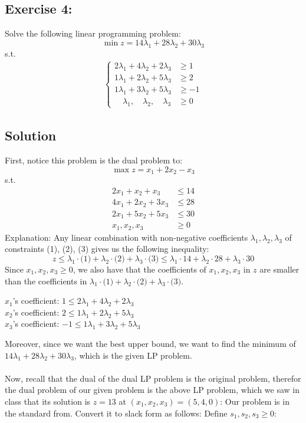 \documentclass{article}
\begin{document}
\subsection{Exercise 4:} Solve the following linear programming problem:
\[\min z = 14\lambda_1 + 28\lambda_2 +30\lambda_3\]
s.t.
\begin{align*}
    \begin{cases}
    2\lambda_1 + 4\lambda_2 +2\lambda_3&\geq 1 \\ 1\lambda_1 + 2\lambda_2 +5\lambda_3&\geq 2 \\
    1\lambda_1 + 3\lambda_2 +5\lambda_3&\geq -1 \\ \quad \lambda_1, \quad \lambda_2,\quad \lambda_3&\geq 0
    \end{cases}
\end{align*}
\subsection*{Solution}
First, notice this problem is the dual problem to: 
\[\max z =x_1 + 2x_2 -x_3\]
s.t.
\begin{align*}
    2x_1 +x_2 + x_3 &\le 14 \\ 4x_1 +2x_2 +3x_3 &\le 28 \\ 2x_1 +5x_2 +5x_3 &\le 30 \\ x_1, x_2, x_3 &\ge 0
\end{align*}
Explanation: Any linear combination with non-negative coefficients $\lambda_1, \lambda_2, \lambda_3$ of constraints (1), (2), (3) gives us the following inequality: 
\[z\le \lambda_1\cdot\text{(1)}+\lambda_2\cdot\text{(2)}+\lambda_3\cdot\text{(3)}\le \lambda_1\cdot 14 +\lambda_2\cdot 28 +\lambda_3\cdot 30\]
Since $x_1, x_2, x_3 \ge 0$, we also have that the coefficients of $x_1, x_2, x_3$ in $z$ are smaller than the coefficients in $\lambda_1\cdot\text{(1)}+\lambda_2\cdot\text{(2)}+\lambda_3\cdot\text{(3)}$.
\begin{center}
$x_1$'s coefficient: $1\le 2\lambda_1 +4\lambda_2+2\lambda_3$\\
$x_2$'s coefficient: $2\le 1\lambda_1+2\lambda_2+5\lambda_3$\\
$x_3$'s coefficient: $-1\le 1\lambda_1 +3\lambda_2 +5\lambda_3$
\end{center}
Moreover, since we want the best upper bound, we want to find the minimum of $14\lambda_1+28 \lambda_2 + 30\lambda_3$, which is the given LP problem.\\ \\ 
Now, recall that the dual of the dual LP problem is the original problem, therefor the dual problem of our given problem is the above LP problem, which we saw in class that its solution is $z=13$ at $(x_1, x_2, x_3) = (5,4,0)$: Our problem is in the standard from. Convert it to slack form as follows:     $\text{Define } s_1, s_2 , s_3 \ge 0:$
\end{document}
